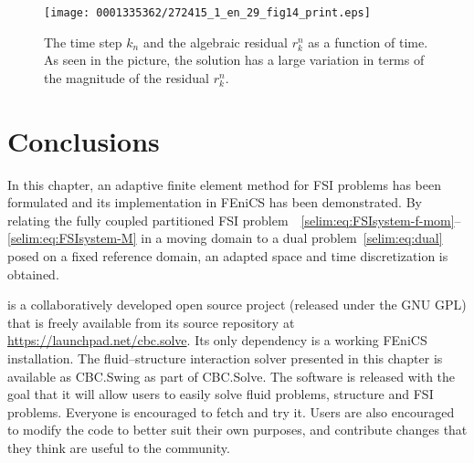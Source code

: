 \begin{figure}[!t]
\centering
\texttt{[image: 0001335362/272415\_1\_en\_29\_fig14\_print.eps]}
\caption{The time step $k_n$ and the algebraic residual $r_k^n$ as
a function of time. As seen in the picture, the solution has a large
variation in terms of the magnitude of the residual $r_k^n$.}
\label{selim:fig:cavity_timestep}\vspace*{3pt}
\end{figure}

\section{Conclusions}

In this chapter,\enlargethispage{12pt} an adaptive finite element method for FSI
problems has been formulated and its implementation in FEniCS has
been demonstrated. By relating the fully coupled partitioned FSI
problem~~\eqref{selim:eq:FSIsystem-f-mom}--\eqref{selim:eq:FSIsystem-M}
 in a moving domain to a dual
problem~\eqref{selim:eq:dual} posed on a fixed reference domain, an
adapted space and time discretization is obtained.


 is a collaboratively developed open source project
(released under the GNU GPL) that is freely available from its source
repository at \url{https://launchpad.net/cbc.solve}. Its only
dependency is a working FEniCS installation. The fluid--structure
interaction solver presented in this chapter is available as CBC.Swing
as part of CBC.Solve. The software is released with the goal that it
will allow users to easily solve fluid problems, structure and FSI
problems. Everyone is encouraged to fetch and try it. Users are also
encouraged to modify the code to better suit their own purposes, and
contribute changes that they think are useful to the community.

\egroup

